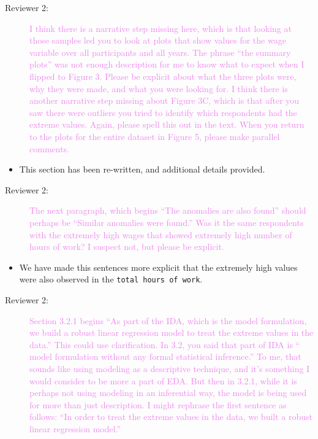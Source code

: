 \documentclass[12pt,a4paper,]{article}
\providecommand{\tightlist}{%
  \setlength{\itemsep}{0pt}\setlength{\parskip}{0pt}}
\begin{document}
\begin{description}
\item[Reviewer 2:]\textcolor{violet}{I think there is a narrative step missing here, which is that looking at those samples led you to look at plots that show values for the wage variable over all participants and all years. The phrase “the summary plots” was not enough description for me to know what to expect when I flipped to Figure 3. Please be explicit about what the three plots were, why they were made, and what you were looking for. I think there is another narrative step missing about Figure 3C, which is that after you saw there were outliers you tried to identify which respondents had the extreme values. Again, please spell this out in the text. When you return to the plots for the entire dataset in Figure 5, please make parallel comments.}
\end{description}

\begin{itemize}
\tightlist
\item
  This section has been re-written, and additional details provided.
\end{itemize}

\begin{description}
\item[Reviewer 2:]\textcolor{violet}{
The next paragraph, which begins “The anomalies are also found” should perhaps be “Similar anomalies were found.” Was it the same respondents with the extremely high wages that showed extremely high number of hours of work? I suspect not, but please be explicit.}
\end{description}

\begin{itemize}
\tightlist
\item
  We have made this sentences more explicit that the extremely high values were also observed in the \texttt{total\ hours\ of\ work}.
\end{itemize}

\begin{description}
\item[Reviewer 2:]\textcolor{violet}{Section 3.2.1 begins “As part of the IDA, which is the model formulation, we build a robust linear regression model to treat the extreme values in the data.” This could use clarification. In 3.2, you said that part of IDA is “ model formulation without any formal statistical inference.” To me, that sounds like using modeling as a descriptive technique, and it’s something I would consider to be more a part of EDA. But then in 3.2.1, while it is perhaps not using modeling in an inferential way, the model is being used for more than just description. I might rephrase the first sentence as follows: “In order to treat the extreme values in the data, we built a robust linear regression model.”}
\end{description}
\end{document}
